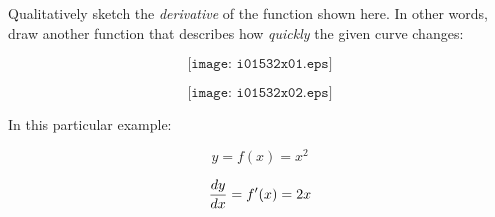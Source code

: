 

Qualitatively sketch the {\it derivative} of the function shown here.  In other words, draw another function that describes how {\it quickly} the given curve changes:

$$\texttt{[image: i01532x01.eps]}$$







$$\texttt{[image: i01532x02.eps]}$$

In this particular example:

$$y = f(x) = x^2$$ 

$${dy \over dx} = f'(x) = 2x$$












